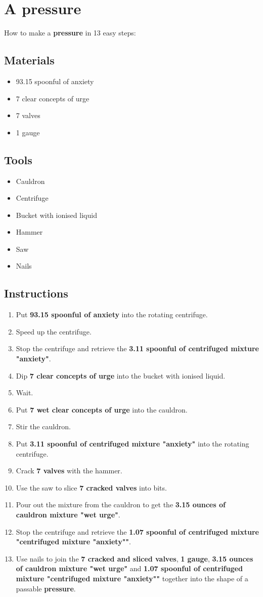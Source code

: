 \documentclass{article}
\begin{document}
\section{A pressure}How to make a \textbf{pressure} in 13 easy steps:

\subsection{Materials}\begin{itemize}
\item 
93.15 spoonful of anxiety
\item 
7 clear concepts of urge
\item 
7 valves
\item 
1 gauge
\end{itemize}
\subsection{Tools}\begin{itemize}
\item 
Cauldron
\item 
Centrifuge
\item 
Bucket with ionised liquid
\item 
Hammer
\item 
Saw
\item 
Nails
\end{itemize}
\subsection{Instructions}\begin{enumerate}
\item 
Put \textbf{93.15 spoonful of anxiety} into the rotating centrifuge.
\item 
Speed up the centrifuge.
\item 
Stop the centrifuge and retrieve the \textbf{3.11 spoonful of centrifuged mixture "anxiety"}.
\item 
Dip \textbf{7 clear concepts of urge} into the bucket with ionised liquid.
\item 
Wait.
\item 
Put \textbf{7 wet clear concepts of urge} into the cauldron.
\item 
Stir the cauldron.
\item 
Put \textbf{3.11 spoonful of centrifuged mixture "anxiety"} into the rotating centrifuge.
\item 
Crack \textbf{7 valves} with the hammer.
\item 
Use the saw to slice \textbf{7 cracked valves} into bits.
\item 
Pour out the mixture from the cauldron to get the \textbf{3.15 ounces of cauldron mixture "wet urge"}.
\item 
Stop the centrifuge and retrieve the \textbf{1.07 spoonful of centrifuged mixture "centrifuged mixture "anxiety""}.
\item 
Use nails to join the \textbf{7 cracked and sliced valves}, \textbf{1 gauge}, \textbf{3.15 ounces of cauldron mixture "wet urge"} and \textbf{1.07 spoonful of centrifuged mixture "centrifuged mixture "anxiety""} together into the shape of a passable \textbf{pressure}.
\end{enumerate}
\newpage
\end{document}
